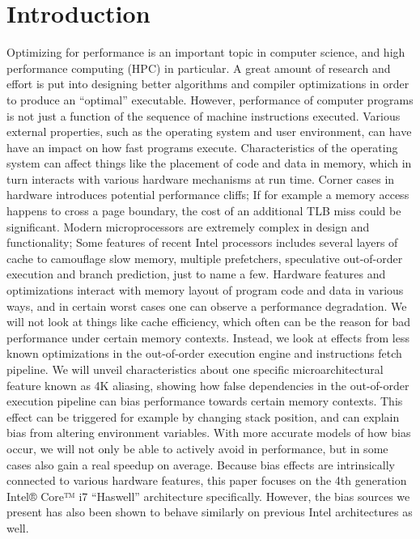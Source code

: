 \documentclass[a4paper,10pt,twocolumn,twoside]{article}
\begin{document}
\section{Introduction}
Optimizing for performance is an important topic in computer science, and high performance computing (HPC) in particular. 
A great amount of research and effort is put into designing better algorithms and compiler optimizations in order to produce an ``optimal'' executable. 
However, performance of computer programs is not just a function of the sequence of machine instructions executed. 
Various external properties, such as the operating system and user environment, can have have an impact on how fast programs execute. 
Characteristics of the operating system can affect things like the placement of code and data in memory, which in turn interacts with various hardware mechanisms at run time.
Corner cases in hardware introduces potential performance cliffs; If for example a memory access happens to cross a page boundary, the cost of an additional TLB miss could be significant. 
Modern microprocessors are extremely complex in design and functionality; Some features of recent Intel processors includes several layers of cache to camouflage slow memory, multiple prefetchers, speculative out-of-order execution and branch prediction, just to name a few.
Hardware features and optimizations interact with memory layout of program code and data in various ways, and in certain worst cases one can observe a performance degradation.
We will not look at things like cache efficiency, which often can be the reason for bad performance under certain memory contexts. 
Instead, we look at effects from less known optimizations in the out-of-order execution engine and instructions fetch pipeline. 
We will unveil characteristics about one specific microarchitectural feature known as 4K aliasing, showing how false dependencies in the out-of-order execution pipeline can bias performance towards certain memory contexts. 
This effect can be triggered for example by changing stack position, and can explain bias from altering environment variables.
With more accurate models of how bias occur, we will not only be able to actively avoid in performance, but in some cases also gain a real speedup on average.
Because bias effects are intrinsically connected to various hardware features, this paper focuses on the 4th generation Intel® Core™ i7 ``Haswell'' architecture specifically. 
However, the bias sources we present has also been shown to behave similarly on previous Intel architectures as well.
\end{document}
